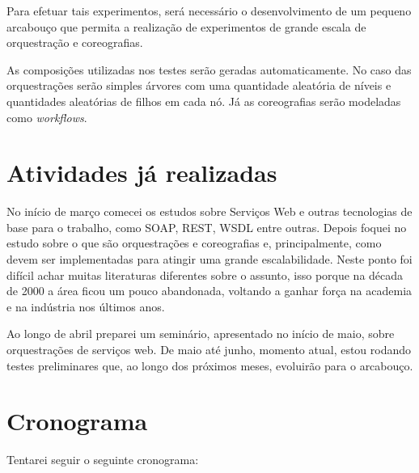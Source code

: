 \documentclass[11pt,a4paper]{article}
\begin{document}
Para efetuar tais experimentos, será necessário o desenvolvimento de um pequeno arcabouço que permita a realização de experimentos de grande escala de orquestração e coreografias. 

As composições utilizadas nos testes serão geradas automaticamente. No caso das orquestrações serão simples árvores com uma quantidade aleatória de níveis e quantidades aleatórias de filhos em cada nó. Já as coreografias serão modeladas como \textit{workflows}.

\section{Atividades já realizadas}
No início de março comecei os estudos sobre Serviços Web e outras tecnologias de base para o trabalho, como SOAP, REST, WSDL entre outras. Depois foquei no estudo sobre o que são orquestrações e coreografias e, principalmente, como devem ser implementadas para atingir uma grande escalabilidade. Neste ponto foi difícil achar muitas literaturas diferentes sobre o assunto, isso porque na década de 2000 a área ficou um pouco abandonada, voltando a ganhar força na academia e na indústria nos últimos anos.

Ao longo de abril preparei um seminário, apresentado no início de maio, sobre orquestrações de serviços web. De maio até junho, momento atual, estou rodando testes preliminares que, ao longo dos próximos meses, evoluirão para o arcabouço.

\section{Cronograma}
Tentarei seguir o seguinte cronograma:
\end{document}
